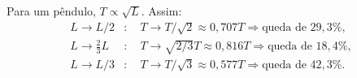 Para um pêndulo, $T\propto\sqrt{L}$. Assim:
\begin{align*}
L\to L/2&:\quad T\to T/\sqrt{2}\approx0{,}707T \Rightarrow \text{queda de }29{,}3\%,\\
L\to \frac{2}{3}L&:\quad T\to \sqrt{2/3}T\approx0{,}816T \Rightarrow \text{queda de }18{,}4\%,\\
L\to L/3&:\quad T\to T/\sqrt{3}\approx0{,}577T \Rightarrow \text{queda de }42{,}3\%.
\end{align*}